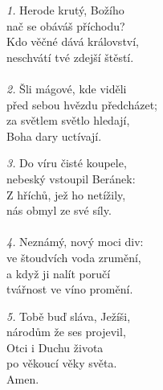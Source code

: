 \begin{translatioMulticol}{3}
{\color{red}\textit{1.}} Herode krutý, Božího\\
nač se obáváš příchodu?\\
Kdo věčné dává království,\\
neschvátí tvé zdejší štěstí.\\
\\
{\color{red}\textit{2.}} Šli mágové, kde viděli\\
před sebou hvězdu předcházet;\\
za světlem světlo hledají,\\
Boha dary uctívají.\columnbreak

{\color{red}\textit{3.}} Do víru čisté koupele,\\
nebeský vstoupil Beránek:\\
Z hříchů, jež ho netížily,\\
nás obmyl ze své síly.\\
\\
{\color{red}\textit{4.}} Neznámý, nový moci div:\\
ve štoudvích voda zrumění,\\
a když ji nalít poručí\\
tvářnost ve víno promění.\columnbreak

{\color{red}\textit{5.}} Tobě buď sláva, Ježíši,\\
národům že ses projevil,\\
Otci i Duchu života\\
po věkoucí věky světa.\\
Amen.
\end{translatioMulticol}
